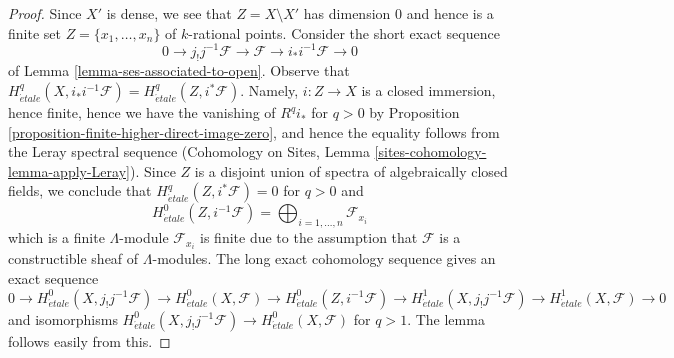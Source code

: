 \documentclass[10pt,a4paper]{amsart}
\theoremstyle{plain}
\theoremstyle{definition}
\theoremstyle{remark}
\numberwithin{equation}{subsection}
\def\etale{{\acute{e}tale}}
\begin{document}
\begin{proof}
Since $X'$ is dense, we see that $Z = X \setminus X'$ has dimension $0$
and hence is a finite set $Z = \{x_1, \ldots, x_n\}$ of $k$-rational points.
Consider the short exact sequence
$$
0 \to j_!j^{-1}\mathcal{F} \to \mathcal{F} \to i_*i^{-1}\mathcal{F} \to 0
$$
of Lemma \ref{lemma-ses-associated-to-open}. Observe that
$H^q_\etale(X, i_*i^{-1}\mathcal{F}) = H^q_\etale(Z, i^*\mathcal{F})$.
Namely, $i : Z \to X$ is a closed immersion, hence finite,
hence we have the vanishing of $R^qi_*$ for $q > 0$ by
Proposition \ref{proposition-finite-higher-direct-image-zero}, and
hence the equality follows from the Leray spectral sequence
(Cohomology on Sites, Lemma \ref{sites-cohomology-lemma-apply-Leray}).
Since $Z$ is a disjoint union of spectra of algebraically closed
fields, we conclude that $H^q_\etale(Z, i^*\mathcal{F}) = 0$
for $q > 0$ and
$$
H^0_\etale(Z, i^{-1}\mathcal{F}) =
\bigoplus\nolimits_{i = 1, \ldots, n} \mathcal{F}_{x_i}
$$
which is a finite $\Lambda$-module $\mathcal{F}_{x_i}$ is finite due to the
assumption that $\mathcal{F}$ is a constructible sheaf of $\Lambda$-modules.
The long exact cohomology sequence gives an exact sequence
$$
0 \to
H^0_\etale(X, j_!j^{-1}\mathcal{F}) \to
H^0_\etale(X, \mathcal{F}) \to
H^0_\etale(Z, i^{-1}\mathcal{F}) \to
H^1_\etale(X, j_!j^{-1}\mathcal{F}) \to
H^1_\etale(X, \mathcal{F}) \to 0
$$
and isomorphisms $H^0_\etale(X, j_!j^{-1}\mathcal{F}) \to
H^0_\etale(X, \mathcal{F})$ for $q > 1$. The lemma follows easily from this.
\end{proof}
\end{document}
